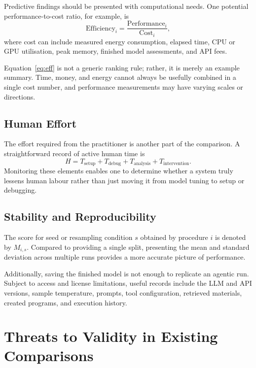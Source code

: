 \documentclass[acmsmall,screen]{acmart}
\begin{document}
Predictive findings should be presented with computational needs. One potential performance-to-cost ratio, for example, is
\begin{equation}
\mathrm{Efficiency}_i =
\frac{\mathrm{Performance}_i}{\mathrm{Cost}_i},
\label{eq:eff}
\end{equation}
where cost can include measured energy consumption, elapsed time, CPU or GPU utilisation, peak memory, finished model assessments, and API fees.

Equation~\ref{eq:eff} is not a generic ranking rule; rather, it is merely an example summary. Time, money, and energy cannot always be usefully combined in a single cost number, and performance measurements may have varying scales or directions.

\subsection{Human Effort}

The effort required from the practitioner is another part of the comparison. A straightforward record of active human time is
\begin{equation}
H=T_{\mathrm{setup}}+T_{\mathrm{debug}}+T_{\mathrm{analysis}}+T_{\mathrm{intervention}}.
\label{eq:human}
\end{equation}
Monitoring these elements enables one to determine whether a system truly lessens human labour rather than just moving it from model tuning to setup or debugging.

\subsection{Stability and Reproducibility}

The score for seed or resampling condition $s$ obtained by procedure $i$ is denoted by $M_{i,s}$. Compared to providing a single split, presenting the mean and standard deviation across multiple runs provides a more accurate picture of performance.

Additionally, saving the finished model is not enough to replicate an agentic run. Subject to access and license limitations, useful records include the LLM and API versions, sample temperature, prompts, tool configuration, retrieved materials, created programs, and execution history.

\section{Threats to Validity in Existing Comparisons}\label{sec:threats}
\end{document}
